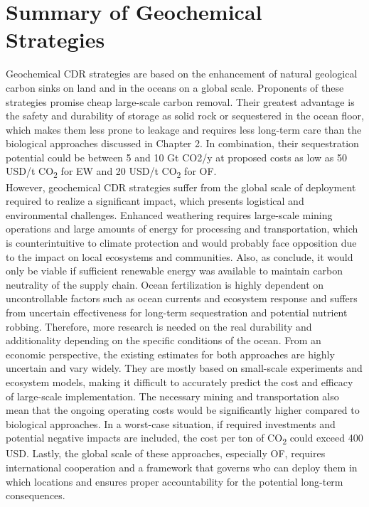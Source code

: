 \section{Summary of Geochemical Strategies}
Geochemical CDR strategies are based on the enhancement of natural geological carbon sinks on land and in the oceans on a global scale. Proponents of these strategies promise cheap large-scale carbon removal. Their greatest advantage is the safety and durability of storage as solid rock or sequestered in the ocean floor, which makes them less prone to leakage and requires less long-term care than the biological approaches discussed in Chapter 2. In combination, their sequestration potential could be between 5 and 10 Gt CO2/y at proposed costs as low as 50 USD/t CO\textsubscript{2} for EW and 20 USD/t CO\textsubscript{2} for OF.\\
However, geochemical CDR strategies suffer from the global scale of deployment required to realize a significant impact, which presents logistical and environmental challenges. Enhanced weathering requires large-scale mining operations and large amounts of energy for processing and transportation, which is counterintuitive to climate protection and would probably face opposition due to the impact on local ecosystems and communities. Also, as \textcite{Goll2021PotentialRock} conclude, it would only be viable if sufficient renewable energy was available to maintain carbon neutrality of the supply chain.
Ocean fertilization is highly dependent on uncontrollable factors such as ocean currents and ecosystem response and suffers from uncertain effectiveness for long-term sequestration and potential nutrient robbing. Therefore, more research is needed on the real durability and additionality depending on the specific conditions of the ocean.
From an economic perspective, the existing estimates for both approaches are highly uncertain and vary widely. They are mostly based on small-scale experiments and ecosystem models, making it difficult to accurately predict the cost and efficacy of large-scale implementation. The necessary mining and transportation also mean that the ongoing operating costs would be significantly higher compared to biological approaches. In a worst-case situation, if required investments and potential negative impacts are included, the cost per ton of CO\textsubscript{2} could exceed 400 USD.
Lastly, the global scale of these approaches, especially OF, requires international cooperation and a framework that governs who can deploy them in which locations and ensures proper accountability for the potential long-term consequences.